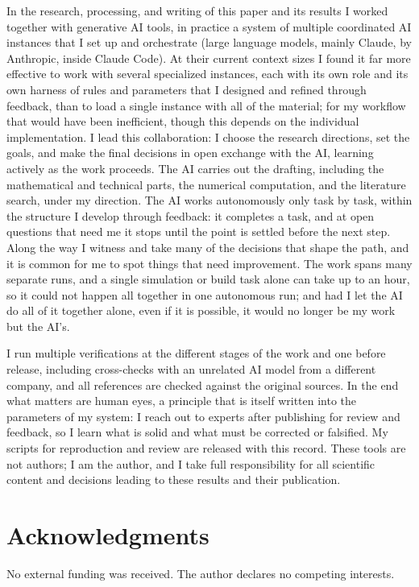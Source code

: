\documentclass[aps,pra,twocolumn,superscriptaddress,longbibliography,floatfix,nofootinbib]{revtex4-2}
\begin{document}
In the research, processing, and writing of this paper and its results I worked together with generative AI tools, in practice a system of multiple coordinated AI instances that I set up and orchestrate (large language models, mainly Claude, by Anthropic, inside Claude Code). At their current context sizes I found it far more effective to work with several specialized instances, each with its own role and its own harness of rules and parameters that I designed and refined through feedback, than to load a single instance with all of the material; for my workflow that would have been inefficient, though this depends on the individual implementation. I lead this collaboration: I choose the research directions, set the goals, and make the final decisions in open exchange with the AI, learning actively as the work proceeds. The AI carries out the drafting, including the mathematical and technical parts, the numerical computation, and the literature search, under my direction. The AI works autonomously only task by task, within the structure I develop through feedback: it completes a task, and at open questions that need me it stops until the point is settled before the next step. Along the way I witness and take many of the decisions that shape the path, and it is common for me to spot things that need improvement. The work spans many separate runs, and a single simulation or build task alone can take up to an hour, so it could not happen all together in one autonomous run; and had I let the AI do all of it together alone, even if it is possible, it would no longer be my work but the AI's.

I run multiple verifications at the different stages of the work and one before release, including cross-checks with an unrelated AI model from a different company, and all references are checked against the original sources. In the end what matters are human eyes, a principle that is itself written into the parameters of my system: I reach out to experts after publishing for review and feedback, so I learn what is solid and what must be corrected or falsified. My scripts for reproduction and review are released with this record. These tools are not authors; I am the author, and I take full responsibility for all scientific content and decisions leading to these results and their publication.

\section*{Acknowledgments}
No external funding was received. The author declares no competing
interests.
\end{document}
